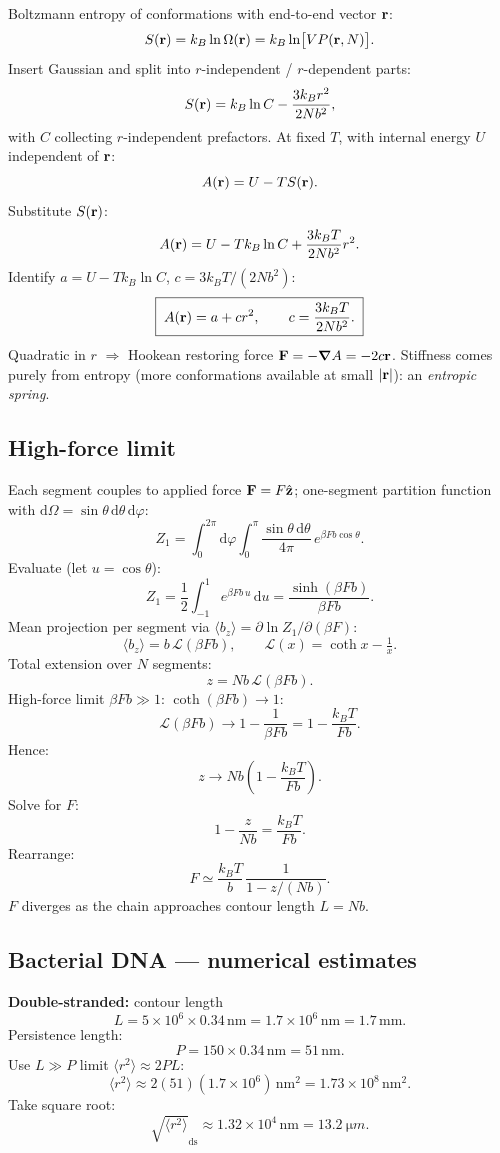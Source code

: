 \documentclass[11pt]{article}
\newcommand{\de}{\mathrm{d}}
\begin{document}
Boltzmann entropy of conformations with end-to-end vector $\vb r$:
\[ S(\vb r)=k_B\ln\Omega(\vb r)=k_B\ln\bigl[V P(\vb r,N)\bigr]. \]
Insert Gaussian and split into $r$-independent / $r$-dependent parts:
\[ S(\vb r)=k_B\ln C-\frac{3k_B r^{2}}{2Nb^{2}}, \]
with $C$ collecting $r$-independent prefactors.
At fixed $T$, with internal energy $U$ independent of $\vb r$:
\[ A(\vb r)=U-TS(\vb r). \]
Substitute $S(\vb r)$:
\[ A(\vb r)=U-Tk_B\ln C+\frac{3k_B T}{2Nb^{2}}r^{2}. \]
Identify $a=U-Tk_B\ln C$, $c=3k_BT/(2Nb^{2})$:
\[ \boxed{\;A(\vb r)=a+cr^{2},\qquad c=\frac{3k_B T}{2Nb^{2}}.\;} \]
Quadratic in $r$ $\Rightarrow$ Hookean restoring force $\vb F=-\grad A=-2c\vb r$. Stiffness comes purely from entropy (more conformations available at small $|\vb r|$): an \emph{entropic spring}.

\subsection*{High-force limit}

Each segment couples to applied force $\vb F=F\hat{\vb z}$; one-segment partition function with $\de\Omega=\sin\theta\,\de\theta\,\de\varphi$:
\[ Z_1=\int_{0}^{2\pi}\!\!\de\varphi\int_{0}^{\pi}\!\!\frac{\sin\theta\,\de\theta}{4\pi}\,e^{\beta Fb\cos\theta}. \]
Evaluate (let $u=\cos\theta$):
\[ Z_1=\frac{1}{2}\int_{-1}^{1}e^{\beta Fb\,u}\,\de u=\frac{\sinh(\beta Fb)}{\beta Fb}. \]
Mean projection per segment via $\langle b_z\rangle=\partial\ln Z_1/\partial(\beta F)$:
\[ \langle b_z\rangle=b\,\mathcal{L}(\beta F b),\qquad \mathcal{L}(x)=\coth x-\tfrac{1}{x}. \]
Total extension over $N$ segments:
\[ z=N b\,\mathcal{L}(\beta F b). \]
High-force limit $\beta Fb\gg 1$: $\coth(\beta Fb)\to 1$:
\[ \mathcal{L}(\beta Fb)\to 1-\frac{1}{\beta Fb}=1-\frac{k_BT}{Fb}. \]
Hence:
\[ z\to Nb\!\left(1-\frac{k_BT}{Fb}\right). \]
Solve for $F$:
\[ 1-\frac{z}{Nb}=\frac{k_BT}{Fb}. \]
Rearrange:
\[ \boxed{\;F\simeq\frac{k_B T}{b}\,\frac{1}{1-z/(Nb)}.\;} \]
$F$ diverges as the chain approaches contour length $L=Nb$.

\subsection*{Bacterial DNA --- numerical estimates}

\textbf{Double-stranded:} contour length
\[ L=5\times 10^{6}\times 0.34\,\text{nm}=1.7\times 10^{6}\,\text{nm}=1.7\,\text{mm}. \]
Persistence length:
\[ P=150\times 0.34\,\text{nm}=51\,\text{nm}. \]
Use $L\gg P$ limit $\langle r^{2}\rangle\approx 2PL$:
\[ \langle r^{2}\rangle\approx 2(51)(1.7\times 10^{6})\,\text{nm}^{2}=1.73\times 10^{8}\,\text{nm}^{2}. \]
Take square root:
\[ \boxed{\;\sqrt{\langle r^{2}\rangle}_{\text{ds}}\approx 1.32\times 10^{4}\,\text{nm}=\SI{13.2}{\micro m}.\;} \]
\end{document}
